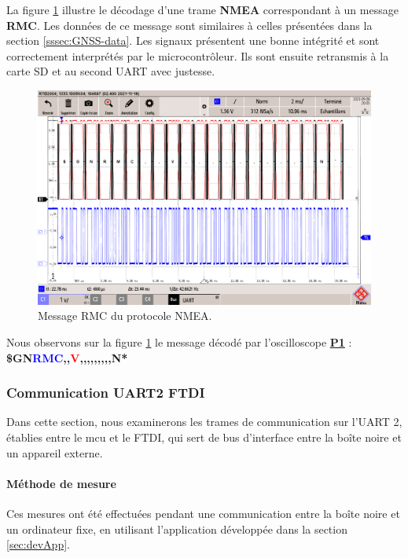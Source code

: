 La figure \ref{fig:message-nmea-rmc} illustre le décodage d'une trame \textbf{NMEA} correspondant à un message \textbf{RMC}. Les données de ce message sont similaires à celles présentées dans la section \ref{sssec:GNSS-data}. Les signaux présentent une bonne intégrité et sont correctement interprétés par le microcontrôleur. Ils sont ensuite retransmis à la carte SD et au second UART avec justesse.


\begin{figure}[H]
	\centering
	\includegraphics[width=0.7\linewidth]{../figures/mesures/UART/message-NMEA-RMC}
	\caption{Message RMC du protocole NMEA.}
	\label{fig:message-nmea-rmc}
\end{figure}

Nous observons sur la figure \ref{fig:message-nmea-rmc} le message décodé par l'oscilloscope \hyperref[ssec:Liste-materiel]{\textbf{P1}} : \textbf{\$GN\textcolor{blue}{RMC},,\textcolor{red}{V},,,,,,,,,N*}

\clearpage

\subsubsection{Communication UART2 FTDI} \label{ssec:Comm-UART2}
Dans cette section, nous examinerons les trames de communication sur l'UART 2, établies entre le \gls{mcu} et le \gls{FTDI}, qui sert de bus d'interface entre la boîte noire et un appareil externe.

\paragraph{Méthode de mesure} Ces mesures ont été effectuées pendant une communication entre la boîte noire et un ordinateur fixe, en utilisant l'application développée dans la section \ref{sec:devApp}.


